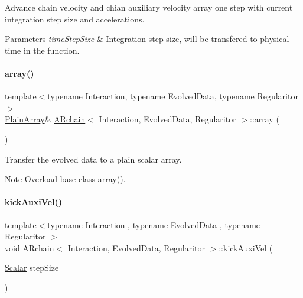Advance chain velocity and chian auxiliary velocity array one step with current integration step size and accelerations. 
\begin{DoxyParams}{Parameters}
{\em time\+Step\+Size} & Integration step size, will be transfered to physical time in the function. \\
\hline
\end{DoxyParams}
\mbox{\label{class_a_rchain_aeb4d9b0a28ae3b4e4286edf838e5a905}} 
\paragraph{\texorpdfstring{array()}{array()}}
{\footnotesize\ttfamily template$<$typename Interaction, typename Evolved\+Data, typename Regularitor$>$ \\
\mbox{\hyperlink{class_a_rchain_a829aca51411c08ffd518294770a374d5}{Plain\+Array}}\& \mbox{\hyperlink{class_a_rchain}{A\+Rchain}}$<$ Interaction, Evolved\+Data, Regularitor $>$\+::array (\begin{DoxyParamCaption}{ }\end{DoxyParamCaption})\hspace{0.3cm}{\ttfamily [inline]}}



Transfer the evolved data to a plain scalar array. 

\begin{DoxyNote}{Note}
Overload base class \mbox{\hyperlink{class_a_rchain_aeb4d9b0a28ae3b4e4286edf838e5a905}{array()}}. 
\end{DoxyNote}
\mbox{\label{class_a_rchain_a53838a7890cee54c69786bda87dd6cd9}} 
\paragraph{\texorpdfstring{kick\+Auxi\+Vel()}{kickAuxiVel()}}
{\footnotesize\ttfamily template$<$typename Interaction , typename Evolved\+Data , typename Regularitor $>$ \\
void \mbox{\hyperlink{class_a_rchain}{A\+Rchain}}$<$ Interaction, Evolved\+Data, Regularitor $>$\+::kick\+Auxi\+Vel (\begin{DoxyParamCaption}\item[{\mbox{\hyperlink{class_a_rchain_a707e42a79e4744424a34c9007e84ee07}{Scalar}}}]{step\+Size }\end{DoxyParamCaption})\hspace{0.3cm}{\ttfamily [private]}}



